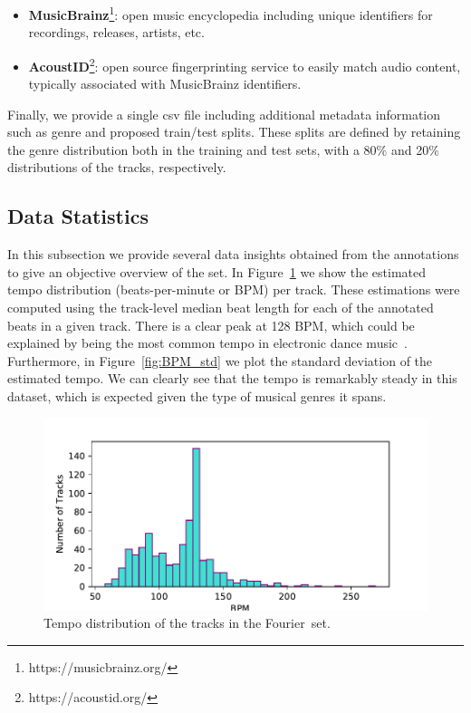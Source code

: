 \documentclass{article}
\newcommand{\setName}{Fourier}
\begin{document}
\begin{itemize}
    \item \textbf{MusicBrainz}\footnote{https://musicbrainz.org/}: open music encyclopedia including unique identifiers for recordings, releases, artists, etc. 
    \item \textbf{AcoustID}\footnote{https://acoustid.org/}: open source fingerprinting service to easily match audio content, typically associated with MusicBrainz identifiers.
\end{itemize}

Finally, we provide a single csv file including additional metadata information such as genre and proposed train/test splits.
These splits are defined by retaining the genre distribution both in the training and test sets, with a 80\% and 20\% distributions of the tracks, respectively.

\subsection{Data Statistics}

In this subsection we provide several data insights obtained from the annotations to give an objective overview of the set.
In Figure~\ref{fig:BPM_dist} we show the estimated tempo distribution (beats-per-minute or BPM) per track.
These estimations were computed using the track-level median beat length for each of the annotated beats in a given track.
There is a clear peak at 128 BPM, which could be explained by being the most common tempo in electronic dance music~\cite{Moelants2008}.
Furthermore, in Figure~\ref{fig:BPM_std} we plot the standard deviation of the estimated tempo.
We can clearly see that the tempo is remarkably steady in this dataset, which is expected given the type of musical genres it spans.


\begin{figure}
    \centerline{\includegraphics[width=\columnwidth]{figs/BPM_distribution.pdf}}
    \caption{Tempo distribution of the tracks in the \setName~set.}
    \label{fig:BPM_dist}
\end{figure}
\end{document}
